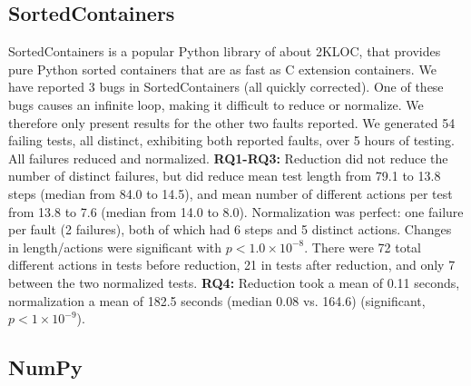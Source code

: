 \subsection{SortedContainers}

SortedContainers \cite{SortedContainers} is a popular Python library
of about 2KLOC, that provides pure Python sorted containers that are as fast as C
extension containers.  We have reported 3 bugs in SortedContainers
(all quickly corrected).  One of these bugs causes an infinite loop,
making it difficult to reduce or normalize.  We therefore only present
results for the other two faults reported.  We
generated 54 failing tests, all distinct, exhibiting both reported
faults, over 5 hours of testing. All failures reduced and normalized.
{\bf RQ1-RQ3:} Reduction did not reduce
the number of distinct failures, but did reduce mean test length from
79.1 to 13.8 steps (median from 84.0 to 14.5), and mean number of
different actions per test from 13.8 to 7.6 (median from 14.0 to 8.0).  Normalization was perfect:  one
failure per fault (2 failures), both of which had 6 steps and 5
distinct actions.  Changes in length/actions were significant with
$p < 1.0\times10^{-8}$.  There were 72 total
different actions in tests before reduction, 21 in tests after
reduction, and only 7 between the two normalized tests.  {\bf RQ4:} Reduction took a mean of 0.11 seconds, normalization a mean of 182.5
seconds (median 0.08 vs. 164.6) (significant, $p < 1\times10^{-9}$).  

\subsection{NumPy}

